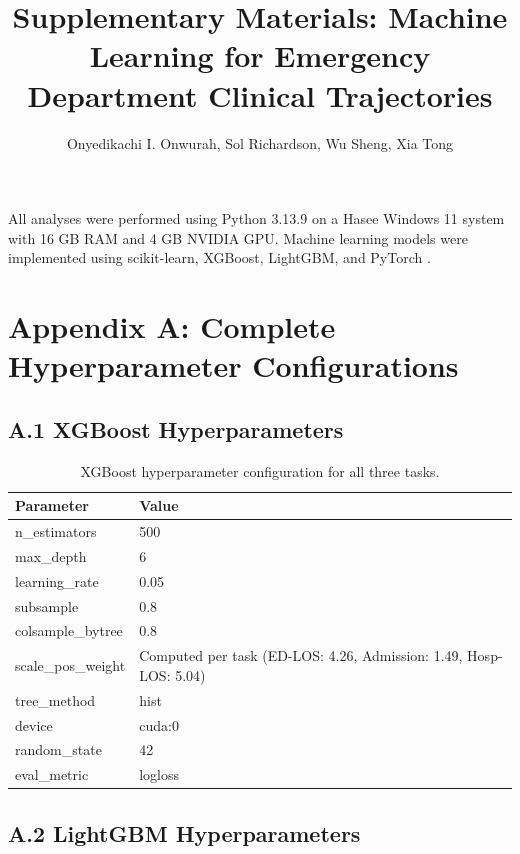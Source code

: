 \documentclass[11pt]{article}
\title{Supplementary Materials: Machine Learning for Emergency Department Clinical Trajectories}
\author{Onyedikachi I. Onwurah, Sol Richardson, Wu Sheng, Xia Tong}
\date{}
\begin{document}
\maketitle

\tableofcontents
\newpage


All analyses were performed using Python 3.13.9 on a Hasee Windows 11 system with 16 GB RAM and 4 GB NVIDIA GPU. Machine learning models were implemented using scikit-learn, XGBoost, LightGBM, and PyTorch \cite{physionet2026}.
\section{Appendix A: Complete Hyperparameter Configurations}

\subsection{A.1 XGBoost Hyperparameters}

\begin{table}[H]
\centering
\caption{XGBoost hyperparameter configuration for all three tasks.}
\begin{tabular}{@{}ll@{}}
\toprule
\textbf{Parameter} & \textbf{Value} \\
\midrule
n\_estimators & 500 \\
max\_depth & 6 \\
learning\_rate & 0.05 \\
subsample & 0.8 \\
colsample\_bytree & 0.8 \\
scale\_pos\_weight & Computed per task (ED-LOS: 4.26, Admission: 1.49, Hosp-LOS: 5.04) \\
tree\_method & hist \\
device & cuda:0 \\
random\_state & 42 \\
eval\_metric & logloss \\
\bottomrule
\end{tabular}
\end{table}

\subsection{A.2 LightGBM Hyperparameters}
\end{document}
